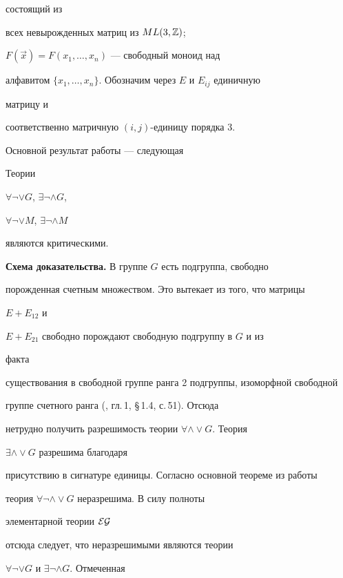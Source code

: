 состоящий из 


всех невырожденных матриц из $ML(3,\Bbb Z)$; 


$F(\Vec x)=F(x_1,\dotsc,x_n)$ --- свободный моноид над 


алфавитом $\{x_1,\dotsc,x_n\}$. Обозначим через $E$ и $E_{ij}$ единичную 


матрицу и 


соответственно матричную $(i,j)$-единицу порядка 3. 


 


Основной результат работы --- следующая 


 


\begin{thmnonum} 


Теории 


$\forall\neg\vee G$, $\exists\neg\wedge G$, 


$\forall\neg\vee M$, $\exists\neg\wedge M$ 


являются критическими. 


\end{thmnonum} 


 


{\bf Схема доказательства.} В группе $G$ есть подгруппа, свободно 


порожденная счетным множеством. Это вытекает из того, что матрицы 


$E+E_{12}$ и 


$E+E_{21}$ свободно порождают свободную подгруппу в $G$ \cite{7} и из 


факта 


существования в свободной группе ранга 2 подгруппы, изоморфной свободной 


группе счетного ранга (\cite{8}, гл.\,1, \S\,1.4, с.\,51). Отсюда 


нетрудно получить разрешимость теории $\forall\wedge\vee G$. Теория 


$\exists\wedge\vee G$ разрешима благодаря 


присутствию в сигнатуре единицы. Согласно основной теореме из работы 


\cite{2} теория $\forall\neg\wedge\vee G$ неразрешима. В силу полноты 


элементарной теории $\cal EG$ 


отсюда следует, что неразрешимыми являются теории 


$\forall\neg\vee G$ и $\exists\neg\wedge G$. Отмеченная 


